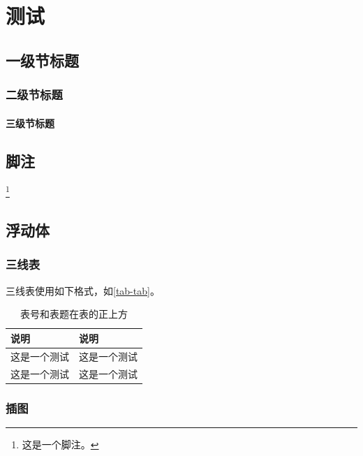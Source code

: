 
\chapter{测试}

\section{一级节标题}

\subsection{二级节标题}

\subsubsection{三级节标题}

\zhlipsum[1]

\section{脚注}

\lipsum[2]\footnote{这是一个脚注。}

\section{浮动体}

\subsection{三线表}

三线表使用如下格式，如\autoref{tab-tab}。

\begin{table}[H]
    \centering
    \caption{表号和表题在表的正上方}
    \label{tab-tab}
    \begin{tabular}{ll}
        \toprule
        说明     & 说明     \\
        \midrule
        这是一个测试 & 这是一个测试 \\
        这是一个测试 & 这是一个测试 \\
        \bottomrule
    \end{tabular}
\end{table}

\subsection{插图}

